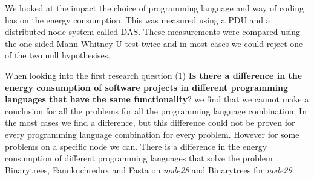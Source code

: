 We looked at the impact the choice of programming language and way of coding has on the energy consumption. This was measured using a PDU and a distributed node system called DAS. These measurements were compared using the one sided Mann Whitney U test twice and in most cases we could reject one of the two null hypothesises. 

When looking into the first research question (1) \textbf{Is there a difference in the energy consumption of software projects in different programming languages that have the same functionality}? we find that we cannot make a conclusion for all the problems for all the programming language combination. In the most cases we find a difference, but this difference could not be proven for every programming language combination for every problem. However for some problems on a specific node we can. There is a difference in the energy consumption of different programming languages that solve the problem Binarytrees, Fannkuchredux and Fasta on \textit{node28} and Binarytrees for \textit{node29}.\\

